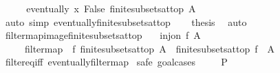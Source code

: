 \begin{isabellebody}
%
\isatagproof
{}\isamarkupfalse%
\ {\isacharminus}{\kern0pt}\isanewline
\ \ \isamarkupfalse%
\ {\isachardoublequoteopen}{\isasymnot}eventually\ {\isacharparenleft}{\kern0pt}{\isasymlambda}x{\isachardot}{\kern0pt}\ False{\isacharparenright}{\kern0pt}\ {\isacharparenleft}{\kern0pt}finite{\isacharunderscore}{\kern0pt}subsets{\isacharunderscore}{\kern0pt}at{\isacharunderscore}{\kern0pt}top\ A{\isacharparenright}{\kern0pt}{\isachardoublequoteclose}\isanewline
\ \ \ \ \isamarkupfalse%
\ {\isacharparenleft}{\kern0pt}auto\ simp{\isacharcolon}{\kern0pt}\ eventually{\isacharunderscore}{\kern0pt}finite{\isacharunderscore}{\kern0pt}subsets{\isacharunderscore}{\kern0pt}at{\isacharunderscore}{\kern0pt}top{\isacharparenright}{\kern0pt}\isanewline
\ \ \isamarkupfalse%
\ {\isacharquery}{\kern0pt}thesis\ \isamarkupfalse%
\ auto\isanewline
{}\isamarkupfalse%
%
\endisatagproof
{\isafoldproof}%
%
\isadelimproof
\isanewline
%
\endisadelimproof
\isanewline
{}\isamarkupfalse%
\ filtermap{\isacharunderscore}{\kern0pt}image{\isacharunderscore}{\kern0pt}finite{\isacharunderscore}{\kern0pt}subsets{\isacharunderscore}{\kern0pt}at{\isacharunderscore}{\kern0pt}top{\isacharcolon}{\kern0pt}\isanewline
\ \ \ {\isachardoublequoteopen}inj{\isacharunderscore}{\kern0pt}on\ f\ A{\isachardoublequoteclose}\isanewline
\ \ \ \ \ {\isachardoublequoteopen}filtermap\ {\isacharparenleft}{\kern0pt}{\isacharparenleft}{\kern0pt}{\isacharbackquote}{\kern0pt}{\isacharparenright}{\kern0pt}\ f{\isacharparenright}{\kern0pt}\ {\isacharparenleft}{\kern0pt}finite{\isacharunderscore}{\kern0pt}subsets{\isacharunderscore}{\kern0pt}at{\isacharunderscore}{\kern0pt}top\ A{\isacharparenright}{\kern0pt}\ {\isacharequal}{\kern0pt}\ finite{\isacharunderscore}{\kern0pt}subsets{\isacharunderscore}{\kern0pt}at{\isacharunderscore}{\kern0pt}top\ {\isacharparenleft}{\kern0pt}f\ {\isacharbackquote}{\kern0pt}\ A{\isacharparenright}{\kern0pt}{\isachardoublequoteclose}\isanewline
%
\isadelimproof
\ \ %
\endisadelimproof
%
\isatagproof
{}\isamarkupfalse%
\ filter{\isacharunderscore}{\kern0pt}eq{\isacharunderscore}{\kern0pt}iff\ eventually{\isacharunderscore}{\kern0pt}filtermap\isanewline
{}\isamarkupfalse%
\ {\isacharparenleft}{\kern0pt}safe{\isacharcomma}{\kern0pt}\ goal{\isacharunderscore}{\kern0pt}cases{\isacharparenright}{\kern0pt}\isanewline
\ \ \isamarkupfalse%
\ {\isacharparenleft}{\kern0pt}{}\ P{\isacharparenright}{\kern0pt}\isanewline

\end{isabellebody}
